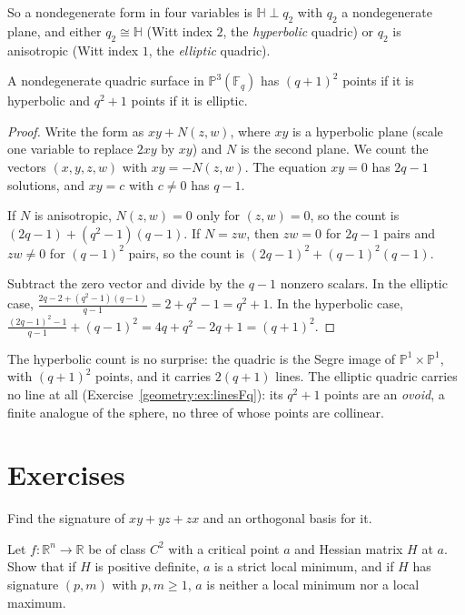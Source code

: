 So a nondegenerate form in four variables is $\mathbb H\perp q_2$ with $q_2$ a nondegenerate plane, and either $q_2\cong\mathbb H$ (Witt index $2$, the
\emph{hyperbolic} quadric) or $q_2$ is anisotropic (Witt index $1$, the \emph{elliptic} quadric).

\begin{theorem}\label{geometry:thm:countquadric}
A nondegenerate quadric surface in $\mathbb P^3(\mathbb F_q)$ has $(q+1)^2$ points if it is hyperbolic and $q^2+1$ points if it is elliptic.
\end{theorem}

\begin{proof}
Write the form as $xy+N(z,w)$, where $xy$ is a hyperbolic plane (scale one variable to replace $2xy$ by $xy$) and $N$ is the second plane. We count
the vectors $(x,y,z,w)$ with $xy=-N(z,w)$. The equation $xy=0$ has $2q-1$ solutions, and $xy=c$ with $c\ne0$ has $q-1$.

If $N$ is anisotropic, $N(z,w)=0$ only for $(z,w)=0$, so the count is $(2q-1)+(q^2-1)(q-1)$. If $N=zw$, then $zw=0$ for $2q-1$ pairs and $zw\ne0$ for
$(q-1)^2$ pairs, so the count is $(2q-1)^2+(q-1)^2(q-1)$.

Subtract the zero vector and divide by the $q-1$ nonzero scalars. In the elliptic case, $\frac{2q-2+(q^2-1)(q-1)}{q-1}=2+q^2-1=q^2+1$. In the hyperbolic case,
$\frac{(2q-1)^2-1}{q-1}+(q-1)^2=4q+q^2-2q+1=(q+1)^2$.
\end{proof}

The hyperbolic count is no surprise: the quadric is the Segre image of $\mathbb P^1\times\mathbb P^1$, with $(q+1)^2$ points, and it carries
$2(q+1)$ lines. The elliptic quadric carries no line at all (Exercise~\ref{geometry:ex:linesFq}): its $q^2+1$ points are an \emph{ovoid}, a finite analogue of
the sphere, no three of whose points are collinear.

\section{Exercises}

\begin{exercise}[$\star$]\label{geometry:ex:signxyz}
Find the signature of $xy+yz+zx$ and an orthogonal basis for it.
\end{exercise}

\begin{exercise}[$\star$]\label{geometry:ex:hessian}
Let $f:\mathbb R^n\to\mathbb R$ be of class $C^2$ with a critical point $a$ and Hessian matrix $H$ at $a$. Show that if $H$ is positive definite, $a$ is a
strict local minimum, and if $H$ has signature $(p,m)$ with $p,m\ge1$, $a$ is neither a local minimum nor a local maximum.
\end{exercise}

